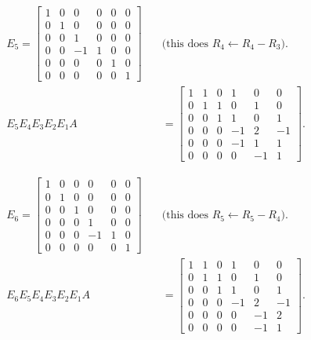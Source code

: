 \documentclass[11pt]{article}
\begin{document}
{%
\begin{align*}
E_5=
\left[
\begin{array}{rrrrrr}
 1& 0& 0& 0& 0& 0\\
 0& 1& 0& 0& 0& 0\\
 0& 0& 1& 0& 0& 0\\
 0& 0&-1& 1& 0& 0\\
 0& 0& 0& 0& 1& 0\\
 0& 0& 0& 0& 0& 1
\end{array}
\right]
\quad&\text{(this does }R_4\leftarrow R_4-R_3\text{)}.\\
E_5E_4E_3E_2E_1A
&=
\left[
\begin{array}{rrrrrr}
 1& 1& 0& 1& 0& 0\\
 0& 1& 1& 0& 1& 0\\
 0& 0& 1& 1& 0& 1\\
 0& 0& 0&-1& 2&-1\\
 0& 0& 0&-1& 1& 1\\
 0& 0& 0& 0&-1& 1
\end{array}
\right].
\end{align*}

\begin{align*}
E_6=
\left[
\begin{array}{rrrrrr}
 1& 0& 0& 0& 0& 0\\
 0& 1& 0& 0& 0& 0\\
 0& 0& 1& 0& 0& 0\\
 0& 0& 0& 1& 0& 0\\
 0& 0& 0&-1& 1& 0\\
 0& 0& 0& 0& 0& 1
\end{array}
\right]
\quad&\text{(this does }R_5\leftarrow R_5-R_4\text{)}.\\
E_6E_5E_4E_3E_2E_1A
&=
\left[
\begin{array}{rrrrrr}
 1& 1& 0& 1& 0& 0\\
 0& 1& 1& 0& 1& 0\\
 0& 0& 1& 1& 0& 1\\
 0& 0& 0&-1& 2&-1\\
 0& 0& 0& 0&-1& 2\\
 0& 0& 0& 0&-1& 1
\end{array}
\right].
\end{align*}


}
\end{document}
